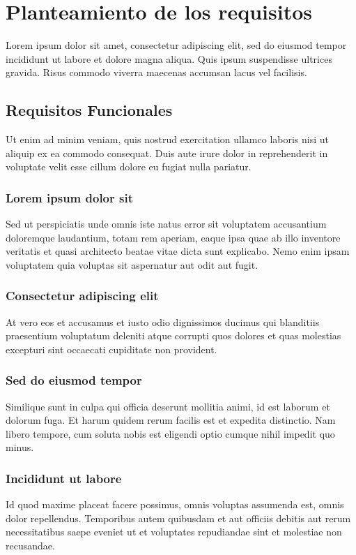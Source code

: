 \chapter{Planteamiento de los requisitos}

Lorem ipsum dolor sit amet, consectetur adipiscing elit, sed do eiusmod tempor incididunt ut labore et dolore magna aliqua. Quis ipsum suspendisse ultrices gravida. Risus commodo viverra maecenas accumsan lacus vel facilisis.

\section{Requisitos Funcionales}

Ut enim ad minim veniam, quis nostrud exercitation ullamco laboris nisi ut aliquip ex ea commodo consequat. Duis aute irure dolor in reprehenderit in voluptate velit esse cillum dolore eu fugiat nulla pariatur.

\subsection{Lorem ipsum dolor sit}
Sed ut perspiciatis unde omnis iste natus error sit voluptatem accusantium doloremque laudantium, totam rem aperiam, eaque ipsa quae ab illo inventore veritatis et quasi architecto beatae vitae dicta sunt explicabo. Nemo enim ipsam voluptatem quia voluptas sit aspernatur aut odit aut fugit.

\subsection{Consectetur adipiscing elit}
At vero eos et accusamus et iusto odio dignissimos ducimus qui blanditiis praesentium voluptatum deleniti atque corrupti quos dolores et quas molestias excepturi sint occaecati cupiditate non provident.

\subsection{Sed do eiusmod tempor}
Similique sunt in culpa qui officia deserunt mollitia animi, id est laborum et dolorum fuga. Et harum quidem rerum facilis est et expedita distinctio. Nam libero tempore, cum soluta nobis est eligendi optio cumque nihil impedit quo minus.

\subsection{Incididunt ut labore}
Id quod maxime placeat facere possimus, omnis voluptas assumenda est, omnis dolor repellendus. Temporibus autem quibusdam et aut officiis debitis aut rerum necessitatibus saepe eveniet ut et voluptates repudiandae sint et molestiae non recusandae.

